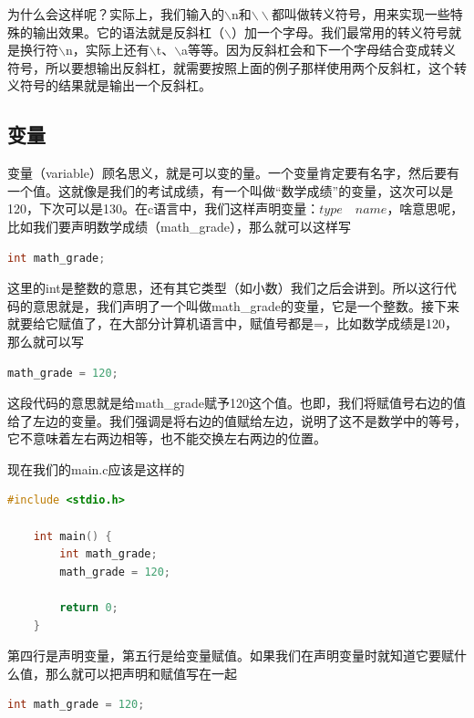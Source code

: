 为什么会这样呢？实际上，我们输入的$\backslash$n和$\backslash{}\backslash$都叫做转义符号，用来实现一些特殊的输出效果。它的语法就是反斜杠（$\backslash$）加一个字母。我们最常用的转义符号就是换行符$\backslash$n，实际上还有$\backslash$t、$\backslash$a等等。因为反斜杠会和下一个字母结合变成转义符号，所以要想输出反斜杠，就需要按照上面的例子那样使用两个反斜杠，这个转义符号的结果就是输出一个反斜杠。

\subsection{变量}

变量（variable）顾名思义，就是可以变的量。一个变量肯定要有名字，然后要有一个值。这就像是我们的考试成绩，有一个叫做“数学成绩”的变量，这次可以是120，下次可以是130。在c语言中，我们这样声明变量：$type\quad{}name$，啥意思呢，比如我们要声明数学成绩（math\_grade），那么就可以这样写

\begin{lstlisting}[language=C]
    int math_grade; 
\end{lstlisting}

这里的int是整数的意思，还有其它类型（如小数）我们之后会讲到。所以这行代码的意思就是，我们声明了一个叫做math\_grade的变量，它是一个整数。接下来就要给它赋值了，在大部分计算机语言中，赋值号都是=，比如数学成绩是120，那么就可以写

\begin{lstlisting}[language=C]
    math_grade = 120;
\end{lstlisting}

这段代码的意思就是给math\_grade赋予120这个值。也即，我们将赋值号右边的值给了左边的变量。我们强调是将右边的值赋给左边，说明了这不是数学中的等号，它不意味着左右两边相等，也不能交换左右两边的位置。

现在我们的main.c应该是这样的

\begin{lstlisting}[language=C]
    #include <stdio.h>

    int main() {
        int math_grade;
        math_grade = 120;

        return 0;
    }
\end{lstlisting}

第四行是声明变量，第五行是给变量赋值。如果我们在声明变量时就知道它要赋什么值，那么就可以把声明和赋值写在一起

\begin{lstlisting}[language=C]
    int math_grade = 120;
\end{lstlisting}


